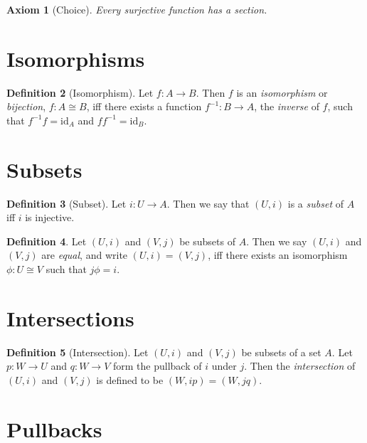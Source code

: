 \documentclass{book}
\newtheorem{ax}{Axiom}[chapter]
\theoremstyle{definition}
\newtheorem{df}[ax]{Definition}
\newcommand{\id}[1]{\ensuremath{\mathrm{id}_{#1}}}
\begin{document}
\begin{ax}[Choice]
Every surjective function has a section.
\end{ax}

\section{Isomorphisms}

\begin{df}[Isomorphism]
Let $f : A \rightarrow B$. Then $f$ is an \emph{isomorphism} or \emph{bijection}, $f : A \cong B$, iff there exists a function $f^{-1} : B \rightarrow A$, the \emph{inverse} of $f$, such that $f^{-1} f = \id{A}$ and $f f^{-1} = \id{B}$.
\end{df}


\section{Subsets}

\begin{df}[Subset]
Let $i : U \rightarrow A$. Then we say that $(U,i)$ is a \emph{subset} of $A$ iff $i$ is injective.
\end{df}

\begin{df}
Let $(U,i)$ and $(V,j)$ be subsets of $A$. Then we say $(U,i)$ and $(V,j)$ are \emph{equal}, and write $(U,i) = (V,j)$, iff there exists an isomorphism $\phi : U \cong V$ such that $j \phi = i$.
\end{df}



\section{Intersections}

\begin{df}[Intersection]
Let $(U,i)$ and $(V,j)$ be subsets of a set $A$. 
Let $p : W \rightarrow U$ and $q : W \rightarrow V$ form the pullback of $i$ under $j$. Then
the \emph{intersection} of $(U,i)$ and $(V,j)$ is defined to be $(W, ip) = (W, jq)$.
\end{df}

\section{Pullbacks}
\end{document}

